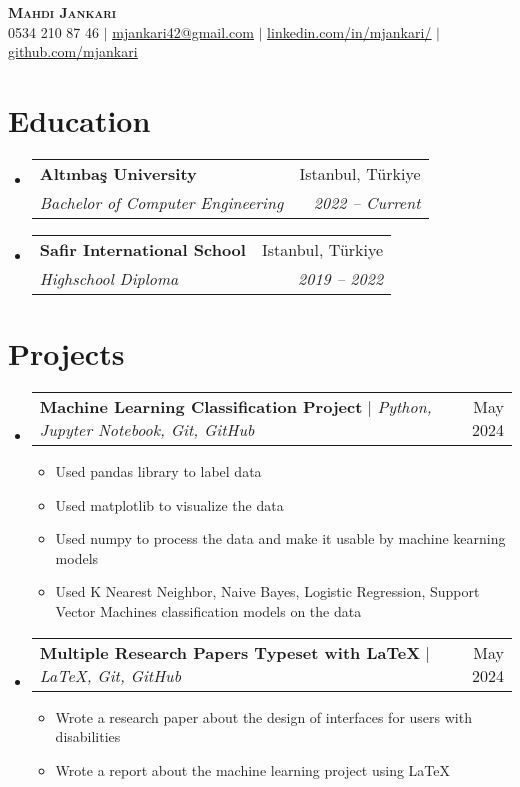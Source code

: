 \documentclass[a4paper,11pt]{article}
\makeatletter
\newcommand{\resumeItem}[1]{
  \item\small{
    {#1 \vspace{-2pt}}
  }
}
\newcommand{\resumeSubheading}[4]{
  \vspace{-2pt}\item
    \begin{tabular*}{0.97\textwidth}[t]{l@{\extracolsep{\fill}}r}
      \textbf{#1} & #2 \\
      \textit{\small#3} & \textit{\small #4} \\
    \end{tabular*}\vspace{-7pt}
}
\newcommand{\resumeProjectHeading}[2]{
    \item
    \begin{tabular*}{0.97\textwidth}{l@{\extracolsep{\fill}}r}
      \small#1 & #2 \\
    \end{tabular*}\vspace{-7pt}
}
\newcommand{\resumeSubHeadingListStart}{\begin{itemize}[leftmargin=0.15in, label={}]}
\newcommand{\resumeSubHeadingListEnd}{\end{itemize}}
\newcommand{\resumeItemListStart}{\begin{itemize}}
\newcommand{\resumeItemListEnd}{\end{itemize}\vspace{-5pt}}
\makeatother
\begin{document}

\begin{center}
    \textbf{\Huge \scshape Mahdi Jankari} \\ \vspace{1pt}
    \small 0534 210 87 46 $|$ \href{mailto:mjankari42@gmail.com}{\underline{mjankari42@gmail.com}} $|$ 
    \href{https://www.linkedin.com/in/mjankari/}{\underline{linkedin.com/in/mjankari/}} $|$
    \href{https://github.com/mjankari}{\underline{github.com/mjankari}}
\end{center}


\section{Education}
  \resumeSubHeadingListStart
    \resumeSubheading
      {Altınbaş University}{Istanbul, Türkiye}
      {Bachelor of Computer Engineering}{2022 -- Current}
    \resumeSubheading
      {Safir International School}{Istanbul, Türkiye}
      {Highschool Diploma}{2019 -- 2022}
  \resumeSubHeadingListEnd

\section{Projects}
    \resumeSubHeadingListStart
      \resumeProjectHeading
          {\textbf{Machine Learning Classification Project} $|$ \emph{Python, Jupyter Notebook, Git, GitHub}}{May 2024}
          \resumeItemListStart
            \resumeItem{Used pandas library to label data}
            \resumeItem{Used matplotlib to visualize the data}
            \resumeItem{Used numpy to process the data and make it usable by machine kearning models}
            \resumeItem{Used K Nearest Neighbor, Naive Bayes, Logistic Regression, Support Vector Machines classification models on the data}
          \resumeItemListEnd
      \resumeProjectHeading
          {\textbf{Multiple Research Papers Typeset with LaTeX} $|$ \emph{LaTeX, Git, GitHub}}{May 2024}
          \resumeItemListStart
            \resumeItem{Wrote a research paper about the design of interfaces for users with disabilities}
            \resumeItem{Wrote a report about the machine learning project using LaTeX}
          \resumeItemListEnd
    \resumeSubHeadingListEnd
\end{document}
